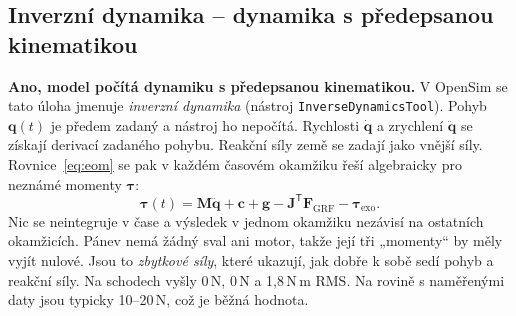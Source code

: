 \documentclass[11pt,a4paper]{article}
\newcommand{\Nm}{\,N\,m}
\begin{document}
\subsection{Inverzní dynamika – dynamika s předepsanou kinematikou}

\textbf{Ano, model počítá dynamiku s předepsanou kinematikou.} V OpenSim se tato
úloha jmenuje \emph{inverzní dynamika} (nástroj \texttt{InverseDynamicsTool}). Pohyb
$\mathbf q(t)$ je předem zadaný a nástroj ho nepočítá. Rychlosti $\dot{\mathbf q}$ a zrychlení
$\ddot{\mathbf q}$ se získají derivací zadaného pohybu. Reakční síly země se zadají jako vnější
síly. Rovnice~\eqref{eq:eom} se pak v každém časovém okamžiku řeší algebraicky pro neznámé
momenty $\boldsymbol\tau$:
\begin{equation}
  \boldsymbol\tau(t) = \mathbf M\ddot{\mathbf q} + \mathbf c + \mathbf g
  - \mathbf J^{\mathsf T}\mathbf F_{\text{GRF}} - \boldsymbol\tau_{\text{exo}} .
  \label{eq:id}
\end{equation}
Nic se neintegruje v čase a výsledek v jednom okamžiku nezávisí na ostatních okamžicích.
Pánev nemá žádný sval ani motor, takže její tři „momenty“ by měly vyjít nulové. Jsou to
\emph{zbytkové síly}, které ukazují, jak dobře k sobě sedí pohyb a reakční síly.
Na schodech vyšly 0\,N, 0\,N a 1,8\Nm{} RMS. Na rovině s naměřenými daty jsou
typicky 10--20\,N, což je běžná hodnota.
\end{document}
